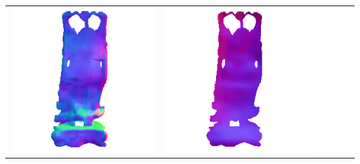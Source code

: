 \begin{center}
\begin{tabularx}{\linewidth}{@{}Y@{}Y@{}Y@{}Y@{}Y@{}Y@{}}
\includegraphics[width=\linewidth]{semisynthetic/20160617_20_marrnet_out.png} &
\includegraphics[width=\linewidth]{semisynthetic/20160617_20_ef_out.png} \\

\end{tabularx}
\end{center}
